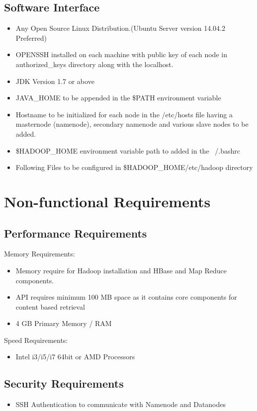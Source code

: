\subsection{Software Interface}
\begin{itemize}
\item Any Open Source Linux Distribution.(Ubuntu Server version 14.04.2 Preferred)
\item OPENSSH installed on each machine with public key of each node in authorized\_keys directory along with the localhost.
\item JDK Version 1.7 or above
\item JAVA\_HOME to be appended in the \$PATH environment variable
\item Hostname to be initialized for each node in the /etc/hosts file having a masternode (namenode), secondary namenode and various slave nodes to be added.
\item \$HADOOP\_HOME environment variable path to added in the ~/.bashrc 
\item Following Files to be configured in \$HADOOP\_HOME/etc/hadoop directory
\end{itemize}

\section{Non-functional Requirements}
\subsection{Performance Requirements}
Memory Requirements:
\begin{itemize}	
\item Memory require for Hadoop installation and HBase and Map Reduce components.
\item API requires minimum 100 MB space as it contains core components for content based retrieval
\item 4 GB Primary Memory / RAM
\end{itemize}

Speed Requirements:
\begin{itemize}
\item Intel i3/i5/i7 64bit or AMD Processors
\end{itemize}

\subsection{Security Requirements}
\begin{itemize}
\item SSH Authentication to communicate with Namenode and Datanodes
\end{itemize}

